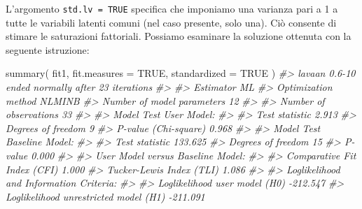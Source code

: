 \documentclass[
  11pt,
]{krantz}
\makeatletter
\newenvironment{Shaded}{\begin{snugshade}}{\end{snugshade}}
\newcommand{\AttributeTok}[1]{\textcolor[rgb]{0.61,0.61,0.61}{#1}}
\newcommand{\CommentTok}[1]{\textcolor[rgb]{0.37,0.37,0.37}{\textit{#1}}}
\newcommand{\ConstantTok}[1]{\textcolor[rgb]{0,0,0}{#1}}
\newcommand{\FunctionTok}[1]{\textcolor[rgb]{0,0,0}{#1}}
\newcommand{\NormalTok}[1]{#1}
\newenvironment{kframe}{%
\medskip{}
\setlength{\fboxsep}{.8em}
 \def\at@end@of@kframe{}%
 \ifinner\ifhmode%
  \def\at@end@of@kframe{\end{minipage}}%
  \begin{minipage}{\columnwidth}%
 \fi\fi%
 \def\FrameCommand##1{\hskip\@totalleftmargin \hskip-\fboxsep
 \colorbox{shadecolor}{##1}\hskip-\fboxsep
     \hskip-\linewidth \hskip-\@totalleftmargin \hskip\columnwidth}%
 \MakeFramed {\advance\hsize-\width
   \@totalleftmargin\z@ \linewidth\hsize
   \@setminipage}}%
 {\par\unskip\endMakeFramed%
 \at@end@of@kframe}
\renewenvironment{Shaded}{\begin{kframe}}{\end{kframe}}
\theoremstyle{definition}
\theoremstyle{definition}
\theoremstyle{definition}
\theoremstyle{definition}
\theoremstyle{remark}
\makeatother
\begin{document}
L'argomento \texttt{std.lv\ =\ TRUE} specifica che imponiamo una varianza pari a 1 a tutte le variabili latenti comuni (nel caso presente, solo una). Ciò consente di stimare le saturazioni fattoriali. Possiamo esaminare la soluzione ottenuta con la seguente istruzione:

\begin{Shaded}
\begin{Highlighting}[]
\FunctionTok{summary}\NormalTok{(}
\NormalTok{  fit1,}
  \AttributeTok{fit.measures =} \ConstantTok{TRUE}\NormalTok{,}
  \AttributeTok{standardized =} \ConstantTok{TRUE}
\NormalTok{)}
\CommentTok{\#\textgreater{} lavaan 0.6{-}10 ended normally after 23 iterations}
\CommentTok{\#\textgreater{} }
\CommentTok{\#\textgreater{}   Estimator                                         ML}
\CommentTok{\#\textgreater{}   Optimization method                           NLMINB}
\CommentTok{\#\textgreater{}   Number of model parameters                        12}
\CommentTok{\#\textgreater{}                                                       }
\CommentTok{\#\textgreater{}   Number of observations                            33}
\CommentTok{\#\textgreater{}                                                       }
\CommentTok{\#\textgreater{} Model Test User Model:}
\CommentTok{\#\textgreater{}                                                       }
\CommentTok{\#\textgreater{}   Test statistic                                 2.913}
\CommentTok{\#\textgreater{}   Degrees of freedom                                 9}
\CommentTok{\#\textgreater{}   P{-}value (Chi{-}square)                           0.968}
\CommentTok{\#\textgreater{} }
\CommentTok{\#\textgreater{} Model Test Baseline Model:}
\CommentTok{\#\textgreater{} }
\CommentTok{\#\textgreater{}   Test statistic                               133.625}
\CommentTok{\#\textgreater{}   Degrees of freedom                                15}
\CommentTok{\#\textgreater{}   P{-}value                                        0.000}
\CommentTok{\#\textgreater{} }
\CommentTok{\#\textgreater{} User Model versus Baseline Model:}
\CommentTok{\#\textgreater{} }
\CommentTok{\#\textgreater{}   Comparative Fit Index (CFI)                    1.000}
\CommentTok{\#\textgreater{}   Tucker{-}Lewis Index (TLI)                       1.086}
\CommentTok{\#\textgreater{} }
\CommentTok{\#\textgreater{} Loglikelihood and Information Criteria:}
\CommentTok{\#\textgreater{} }
\CommentTok{\#\textgreater{}   Loglikelihood user model (H0)               {-}212.547}
\CommentTok{\#\textgreater{}   Loglikelihood unrestricted model (H1)       {-}211.091}

\end{Highlighting}
\end{Shaded}
\end{document}
